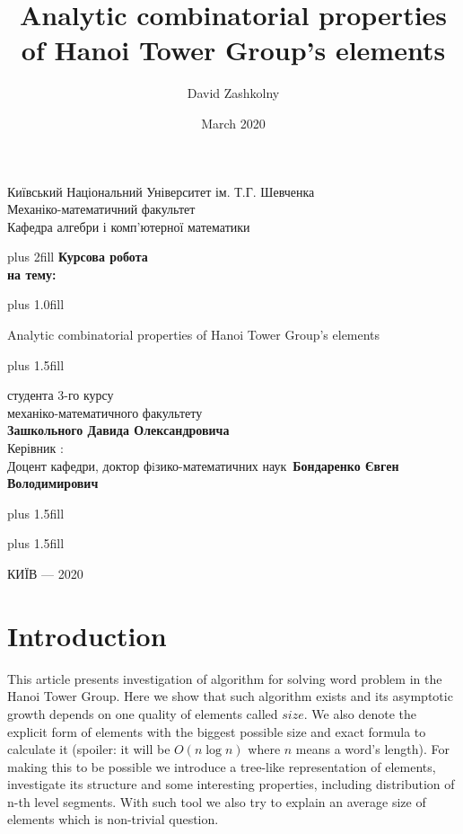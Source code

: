 \documentclass[a4paper,12pt]{amsart}
\title{ 	Analytic combinatorial properties of Hanoi Tower Group's elements }
\author{ David Zashkolny }
\date{March 2020}
\begin{document}
\thispagestyle {empty}
\begin{center}
	\large  Київський Національний Університет ім. Т.Г. Шевченка \\
	Механіко-математичний факультет \\
	Кафедра алгебри і комп'ютерної математики \par
\end{center}


\begin{center}
	\vskip0cm plus 2fill
	\vspace{2.5cm} {\bf Курсова робота}\\
	
	{\bf на тему:}\\
\end{center}


\vskip0cm plus 1.0fill



\begin{center}\bf
	{\LARGE 
		Analytic combinatorial properties of Hanoi Tower Group's elements \par}
\end{center}

\vskip0cm plus 1.5fill

\hangindent=7cm  \noindent  
студента 3-го курсу\\
механіко-математичного факультету\\
{\bf Зашкольного Давида Олександровича}\\[2cm]
Керівник :\\
Доцент кафедри, доктор фiзико-математичних наук\
{\bf Бондаренко Євген Володимирович}


\vskip0cm plus 1.5fill

\vskip5cm plus 1.5fill            
\begin{center}
	КИЇВ --- 2020
\end{center}

\newpage
{}

\tableofcontents

\newpage

\section{Introduction}

This article presents investigation of algorithm for solving word problem in 
the Hanoi Tower Group. Here we show that such algorithm exists and its asymptotic growth
depends on one quality of elements called $size$. We also denote the explicit form of 
elements with the biggest possible size and exact formula to calculate it (spoiler: it will 
be $O(n \log n)$ where $n$ means a word's length). For making this to be possible we 
introduce a tree-like representation of elements, investigate its structure and some interesting 
properties, including distribution of n-th level segments. With such tool we also try to 
explain an average size of elements which is non-trivial question.
\end{document}
